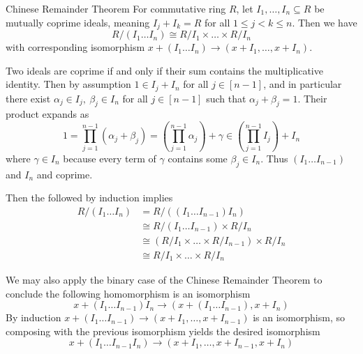 \begin{theorem}{Chinese Remainder Theorem}
    For commutative ring $R$, let $I_1,\dots,I_n\subseteq R$ be mutually coprime ideals, meaning $I_j+I_k = R$ for all $1\leq j<k\leq n$.
    Then we have
    \begin{equation}
        R/(I_1\dots I_n)\cong R/I_1\times\dots\times R/I_n
    \end{equation}
    with corresponding isomorphism $x+(I_1\dots I_n)\to(x+I_1,\dots,x+I_n)$.

    \proof
    Two ideals are coprime if and only if their sum contains the multiplicative identity.
    Then by assumption $1\in I_j + I_n$ for all $j\in[n-1]$, and in particular there exist $\alpha_j\in I_j,\ \beta_j\in I_n$ for all $j\in[n-1]$ such that $\alpha_j+\beta_j=1$.
    Their product expands as
    \begin{equation}
        1 = \prod_{j=1}^{n-1} \left(\alpha_j+\beta_j\right)
        = \left(\prod_{j=1}^{n-1} \alpha_j\right) + \gamma
        \in\left(\prod_{j=1}^{n-1} I_j\right) + I_n
    \end{equation}
    where $\gamma\in I_n$ because every term of $\gamma$ contains some $\beta_j\in I_n$.
    Thus $(I_1\dots I_{n-1})$ and $I_n$ and coprime.

    Then the  followed by induction implies
    \begin{align}
        R/(I_1\dots I_n) &= R/((I_1\dots I_{n-1})I_n) \\
        &\cong R/(I_1\dots I_{n-1})\times R/I_n \\
        &\cong (R/I_1\times\dots\times R/I_{n-1})\times R/I_n \\
        &\cong R/I_1\times\dots\times R/I_n
    \end{align}
    
    We may also apply the binary case of the Chinese Remainder Theorem to conclude the following homomorphism is an isomorphism
    \begin{equation}
         x+(I_1\dots I_{n-1})I_n
         \to(x+(I_1\dots I_{n-1}),x+I_n)
    \end{equation}
    By induction $x+(I_1\dots I_{n-1})\to(x+I_1,\dots,x+I_{n-1})$ is an isomorphism, so composing with the previous isomorphism yields the desired isomorphism
    \begin{equation}
         x+(I_1\dots I_{n-1}I_n)
         \to(x+I_1,\dots,x+I_{n-1},x+I_n)
    \end{equation}
\end{theorem}


